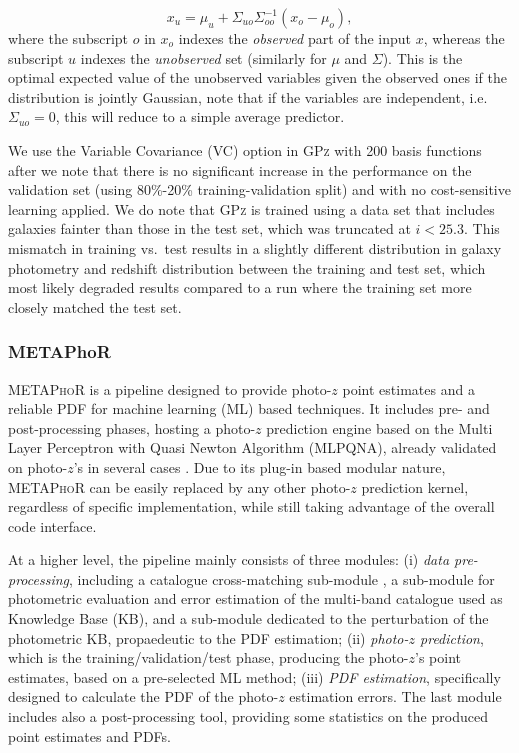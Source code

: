 \begin{equation}
x_{u} = \mu_{u}+\Sigma_{uo}\Sigma_{oo}^{-1}(x_{o}-\mu_{o}),
\end{equation}  %
where the subscript $o$ in $x_{o}$ indexes the \emph{observed} part of the input $x$, whereas the subscript $u$ indexes the \emph{unobserved} set (similarly for $\mu$ and $\Sigma$). This is the optimal expected value of the unobserved variables given the observed ones if the distribution is jointly Gaussian, note that if the variables are independent, i.e. $\Sigma_{uo}=0$, this will reduce to a simple average predictor.

We use the Variable Covariance (VC) option in \textsc{GPz} with 200 basis functions after we note that there is no significant increase in the performance on the validation set (using 80\%-20\% training-validation split) and with no cost-sensitive learning applied.  We do note that \textsc{GPz} is trained using a data set that includes galaxies fainter than those in the test set, which was truncated at $i<25.3$.  This mismatch in training vs.~test results in a slightly different distribution in galaxy photometry and redshift distribution between the training and test set, which most likely degraded results compared to a run where the training set more closely matched the test set.

\subsubsection{METAPhoR}
\label{sec:metaphor}
\textsc{METAPhoR} \citep[Machine-learning Estimation Tool for Accurate Photometric Redshifts,][]{Cavuoti:17} is a pipeline designed to provide photo-$z$ point estimates and a reliable PDF for machine learning (ML) based techniques. It includes pre- and post-processing phases, hosting a photo-$z$ prediction engine based on the Multi Layer Perceptron with Quasi Newton Algorithm (MLPQNA), already validated on photo-$z$'s in several cases \citep{de_Jong:17,Cavuoti:17b,Cavuoti:15,Brescia:14,Brescia:13,Biviano:13}. Due to its plug-in based modular nature, \textsc{METAPhoR} can be easily replaced by any other photo-$z$ prediction kernel, regardless of specific implementation, while still taking advantage of the overall code interface.

At a higher level, the pipeline mainly consists of three modules: (i) \textit{data pre-processing}, including a catalogue cross-matching sub-module \citep[based on the tool C3, ][]{Riccio:17}, a sub-module for photometric evaluation and error estimation of the multi-band catalogue used as Knowledge Base (KB), and a sub-module dedicated to the perturbation of the photometric KB, propaedeutic to the PDF estimation; (ii) \textit{photo-$z$ prediction}, which is the training/validation/test phase, producing the photo-$z$'s point estimates, based on a pre-selected ML method; (iii) \textit{PDF estimation}, specifically designed to calculate the PDF of the photo-$z$ estimation errors. The last module includes also a post-processing tool, providing some statistics on the produced point estimates and PDFs.

